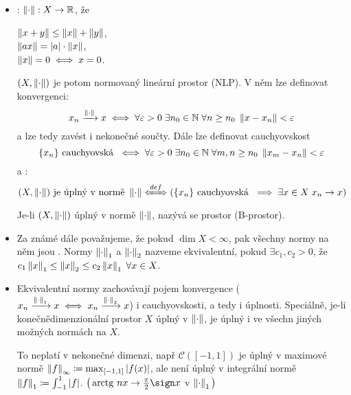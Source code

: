 \begin{itemize}
    \item {}: \hspace{1em}
    $\left\lVert\cdot\right\rVert: X \to \mathbb{R}$, že \parbox[t]{20em}{
        $\left\lVert x+y\right\rVert \leq \left\lVert x\right\rVert + \left\lVert y\right\rVert$, \\[3pt]
        $\left\lVert ax\right\rVert = |a| \cdot \left\lVert x\right\rVert$, \\[3pt]
        $\left\lVert x\right\rVert = 0 \iff x = 0$.
    }
    
    $(X, \left\lVert\cdot\right\rVert)$ je potom normovaný lineární prostor (NLP). V něm lze definovat konvergenci:
    $$
        x_n \xrightarrow{\left\lVert\cdot\right\rVert} x
        \iff
        \forall \varepsilon > 0 \;
        \exists n_0 \in \mathbb{N} \;
        \forall n \geq n_0 \;
        \left\lVert x - x_n\right\rVert < \varepsilon
    $$
    a lze tedy zavést i nekonečné součty.
    Dále lze definovat cauchyovskost
    $$
        \{ x_n \} \text{ cauchyovská }
        \iff
        \forall \varepsilon > 0 \;
        \exists n_0 \in \mathbb{N} \;
        \forall m,n \geq n_0 \;
        \left\lVert x_m - x_n\right\rVert < \varepsilon
    $$
    a :
    $$
        (X, \norm{\cdot}) \text{ je úplný v normě } \norm{\cdot}
        \xLeftrightarrow{def}
        \left(
        \{ x_n \} \text{ cauchyovská }
        \implies
        \exists x \in X \; x_n \to x
        \right)
    $$
    Je-li $(X, \left\lVert\cdot\right\rVert)$ úplný v normě $\left\lVert\cdot\right\rVert$, nazývá se  prostor (B-prostor).
    
    \item Za známé dále považujeme, že pokud $\dim X < \infty$, pak všechny normy na něm jsou . Normy $\left\lVert\cdot\right\rVert_1$ a $\left\lVert\cdot\right\rVert_2$ nazveme ekvivalentní, pokud $\exists c_1, c_2 > 0$, že
    $c_1 \left\lVert x\right\rVert_1 \leq \left\lVert x\right\rVert_2 \leq c_2 \left\lVert x\right\rVert_1 \; \forall x \in X$.
    
    \item Ekvivalentní normy zachovávají pojem konvergence ($x_n \xrightarrow{\left\lVert\cdot\right\rVert_1} x \iff x_n \xrightarrow{\left\lVert\cdot\right\rVert_2} x$) i cauchyovskosti, a tedy i úplnosti. Speciálně, je-li konečnědimenzionální prostor $X$ úplný v $\left\lVert\cdot\right\rVert$, je úplný i ve všechn jiných možných normách na $X$.
    
    To neplatí v nekonečné dimenzi, např $\mathcal{C}([-1, 1])$ je úplný v maximové normě $\left\lVert f\right\rVert_\infty \coloneqq \max_{[-1, 1]} |f(x)|$, ale není úplný v integrální normě $\left\lVert f\right\rVert_1 \coloneqq \int_{-1}^1 |f|$. $\big(\arctg nx \to \frac{\pi}{2} \sign x$ v $\left\lVert\cdot\right\rVert_1\big)$
    

\end{itemize}
